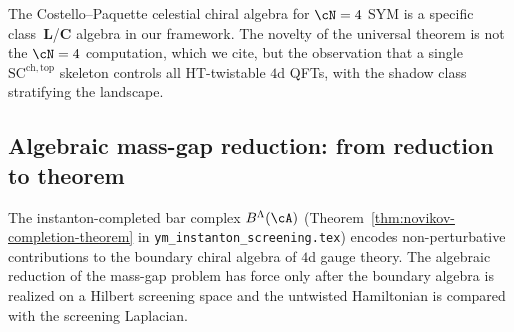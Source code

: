 \begin{remark}
\label{rem:costello-paquette-specialization}
The Costello--Paquette celestial chiral algebra for $\cN=4$ SYM is
a specific class~$\mathbf L$/$\mathbf C$ algebra in our framework.
The novelty of the universal theorem is not the $\cN=4$
computation, which we cite, but the observation that a single
$\mathrm{SC}^{\mathrm{ch,top}}$ skeleton controls all HT-twistable
$4$d QFTs, with the shadow class stratifying the landscape.
\end{remark}

\subsection{Algebraic mass-gap reduction: from reduction to theorem}
\label{subsec:ym-mass-gap-theorem}

The instanton-completed bar complex $B^\Lambda(\cA)$
(Theorem~\ref{thm:novikov-completion-theorem} in
\texttt{ym\_instanton\_screening.tex}) encodes non-perturbative
contributions to the boundary chiral algebra of $4$d gauge theory.
The algebraic reduction of the mass-gap problem has force only after
the boundary algebra is realized on a Hilbert screening space and the
untwisted Hamiltonian is compared with the screening Laplacian.

